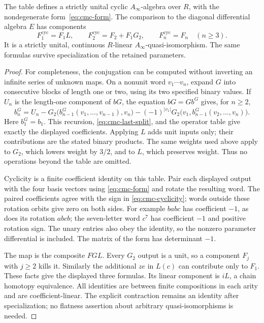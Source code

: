 \begin{theorem}\label{thm:cmc-cyclic-comparison}
The table defines a strictly unital cyclic \(A_\infty\)-algebra
over \(R\), with the nondegenerate form~\eqref{eq:cmc-form}.
The comparison to the diagonal differential algebra \(E\) has
components
\[
 F^{\mathrm{cyc}}_1=F_1L,\qquad
 F^{\mathrm{cyc}}_2=F_2+F_1G_2,\qquad
 F^{\mathrm{cyc}}_n=F_n\quad(n\ge3).
\]
It is a strictly unital, continuous \(R\)-linear
\(A_\infty\)-quasi-isomorphism. The same formulas survive
specialization of the retained parameters.
\end{theorem}

\begin{proof}
For completeness, the conjugation can be computed without
inverting an infinite series of unknown maps. On a nonunit word
\(v_1\cdots v_n\), expand \(G\) into consecutive blocks of length
one or two, using its two specified binary values. If \(U_n\)
is the length-one component of \(bG\), the equation \(bG=Gb^G\)
gives, for \(n\ge2\),
\[
 b^G_n=U_n
 -G_2\bigl(b^G_{n-1}(v_1,\ldots,v_{n-1}),v_n\bigr)
 -(-1)^{|v_1|}
 G_2\bigl(v_1,b^G_{n-1}(v_2,\ldots,v_n)\bigr).
\]
Here \(b^G_1=b_1\). This recursion, \eqref{eq:cmc-last-split},
and the operator table give exactly the displayed coefficients.
Applying \(L\) adds unit inputs only; their contributions are
the stated binary products. The same weights used above apply
to \(G_2\), which lowers weight by \(3/2\), and to \(L\), which
preserves weight. Thus no operations beyond the table are omitted.

Cyclicity is a finite coefficient identity on this table. Pair
each displayed output with the four basis vectors using
\eqref{eq:cmc-form} and rotate the resulting word.
The paired coefficients agree with the sign in
\eqref{eq:cmc-cyclicity}; words outside these rotation orbits
give zero on both sides. For example \(bab c\) has coefficient
\(-1\), as does its rotation \(abc b\); the seven-letter word
\(c^7\) has coefficient \(-1\) and positive rotation sign.
The unary entries also obey the identity, so the nonzero
parameter differential is included. The matrix of the form
has determinant \(-1\).

The map is the composite \(FGL\).
Every \(G_2\) output is a unit, so a component \(F_j\) with
\(j\ge2\) kills it. Similarly the additional \(ze\) in \(L(c)\)
can contribute only to \(F_1\). These facts give the displayed
three formulas. Its linear component is \(iL\), a chain
homotopy equivalence. All identities are between finite
compositions in each arity and are coefficient-linear.
The explicit contraction remains an identity after
specialization; no flatness assertion about arbitrary
quasi-isomorphisms is needed.
\end{proof}


